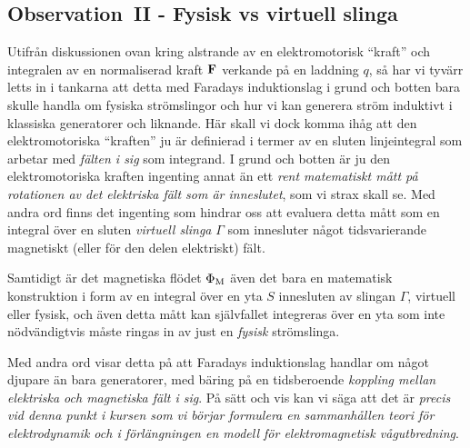 \subsection{Observation~II - Fysisk vs virtuell slinga}
Utifr{\aa}n diskussionen ovan kring alstrande av en elektromotorisk ``kraft''
och integralen av en normaliserad kraft ${\bf F}$ verkande p{\aa} en laddning
$q$, s{\aa} har vi tyv{\"a}rr letts in i tankarna att detta med Faradays
induktionslag i grund och botten bara skulle handla om fysiska str{\"o}mslingor
och hur vi kan generera str{\"o}m induktivt i klassiska generatorer och
liknande. H{\"a}r skall vi dock komma ih{\aa}g att den elektromotoriska
``kraften'' ju {\"a}r definierad i termer av en sluten linjeintegral som
arbetar med {\it f{\"a}lten i sig} som integrand. I grund och botten {\"a}r
ju den elektromotoriska kraften ingenting annat {\"a}n ett {\it rent
matematiskt m{\aa}tt p{\aa} rotationen av det elektriska f{\"a}lt som
{\"a}r inneslutet}, som vi strax skall se.
Med andra ord finns det ingenting som hindrar oss att evaluera detta m{\aa}tt
som en integral {\"o}ver en sluten {\it virtuell slinga} $\Gamma$ som
innesluter n{\aa}got tidsvarierande magnetiskt (eller f{\"o}r den delen
elektriskt) f{\"a}lt.

Samtidigt {\"a}r det magnetiska fl{\"o}det $\Phi_{\rm M}$ {\"a}ven det bara en
matematisk konstruktion i form av en integral {\"o}ver en yta $S$ innesluten
av slingan $\Gamma$, virtuell eller fysisk, och {\"a}ven detta m{\aa}tt kan
sj{\"a}lvfallet integreras {\"o}ver en yta som inte n{\"o}dv{\"a}ndigtvis
m{\aa}ste ringas in av just en {\it fysisk} str{\"o}mslinga.

Med andra ord visar detta p{\aa} att Faradays induktionslag handlar om n{\aa}got
djupare {\"a}n bara generatorer, med b{\"a}ring p{\aa} en tidsberoende
{\it koppling mellan elektriska och magnetiska f{\"a}lt i sig}.
P{\aa} s{\"a}tt och vis kan vi s{\"a}ga att det {\"a}r {\it precis vid denna
punkt i kursen som vi b{\"o}rjar formulera en sammanh{\aa}llen teori f{\"o}r
elektrodynamik och i f{\"o}rl{\"a}ngningen en modell f{\"o}r elektromagnetisk
v{\aa}gutbredning}.

